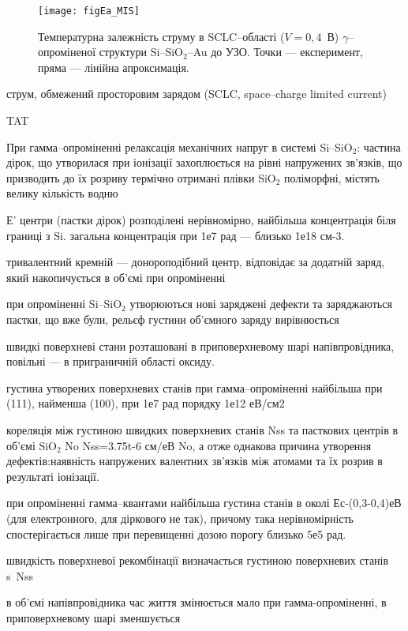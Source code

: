 \documentclass[a4paper,14pt,oneside,openany]{memoir}
\begin{document}
\begin{figure}
\center
\texttt{[image: figEa\_MIS]}%
\caption{\label{figEa_MIS}
Температурна залежність струму в SCLC--області  ($V=0,4$~В)
$\gamma$--опроміненої структури Si--SiO$_2$--Au до УЗО.
Точки --- експеримент,
пряма --- лінійна апроксимація.
}%
\end{figure}


струм, обмежений  просторовим зарядом (SCLC, space--charge limited current)



TAT \cite{TAT:Gilmore,TAT:GopalSST,TAT:Gopal}


\cite{PersenkovBook}
При гамма--опроміненні релаксація механічних напруг в системі Si--SiO$_2$:
частина дірок, що утворилася при іонізації захоплюється на рівні напружених зв'язків, що призводить до їх розриву
термічно отримані плівки SiO$_2$ поліморфні,
містять велику кількість водню

Е' центри (пастки дірок) розподілені нерівномірно, найбільша концентрація біля границі з Si.
загальна концентрація при 1е7 рад ---  близько 1е18 см-3.

тривалентний кремній --- донороподібний центр,
відповідає за додатній заряд, який накопичується в об'ємі при опроміненні

при опроміненні Si--SiO$_2$ утворюються нові заряджені дефекти та заряджаються пастки,
що вже були,
рельєф густини об'ємного заряду вирівнюється

швидкі поверхневі стани розташовані в приповерхневому шарі напівпровідника,
повільні --- в приграничній області оксиду.

густина утворених поверхневих станів при гамма--опроміненні найбільша при (111), найменша (100),
при 1е7 рад порядку 1е12 еВ/см2

кореляція між густиною швидких поверхневих станів Nss та пасткових центрів в об'ємі SiO$_2$ No
Nss=3.75t-6 см/еВ No,
а отже однакова причина утворення дефектів:наявність напружених валентних зв'язків між атомами та їх розрив в результаті іонізації.

при опроміненні гамма--квантами найбільша густина станів в околі Ес-(0,3-0,4)еВ (для електронного, для діркового не так),
причому така нерівномірність спостерігається лише при перевищенні дозою порогу близько 5е5 рад.

швидкість поверхневої рекомбінації визначається густиною поверхневих станів
s~Nss

в об'ємі напівпровідника час життя змінюється мало при гамма-опроміненні, в приповерхневому шарі зменшується
\end{document}
